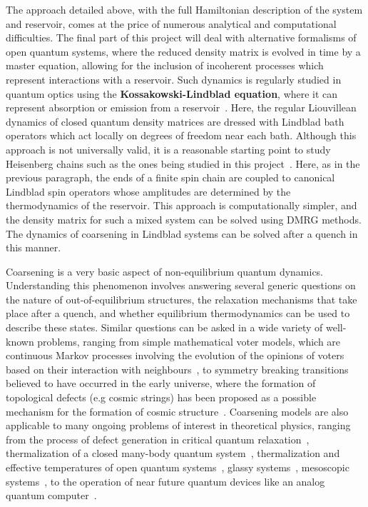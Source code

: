 \documentclass[a4paper,11pt,color]{article}
\begin{document}
The approach detailed above, with the full Hamiltonian description of the system and reservoir, comes at the price of numerous analytical and computational difficulties. The final part of this project will deal with alternative formalisms of open quantum systems, where the reduced density matrix is evolved in time by a master equation, allowing for the inclusion of incoherent processes which represent interactions with a reservoir. Such dynamics is regularly studied in quantum optics using the \textbf{Kossakowski-Lindblad equation}, where it can represent absorption or emission from a reservoir~\cite{lindblad}. Here, the regular Liouvillean dynamics of closed quantum density matrices are dressed with Lindblad bath operators which act locally on degrees of freedom near each bath. Although this approach is not universally valid, it is a reasonable starting point to study Heisenberg chains such as the ones being studied in this project~\cite{spinchains:lindblad}. Here, as in the previous paragraph, the ends of 
a finite spin chain are coupled to canonical Lindblad spin operators whose amplitudes are determined by the thermodynamics of the reservoir.  This approach is computationally simpler, and the density matrix for such a mixed system can be solved using DMRG methods. The dynamics of coarsening in Lindblad systems can be solved after a quench in this manner.

Coarsening is a very basic aspect of non-equilibrium quantum dynamics. Understanding this phenomenon involves answering  several generic questions on the nature of out-of-equilibrium structures, the relaxation mechanisms that take place after
a quench, and whether equilibrium thermodynamics can be used to describe these states.  Similar questions can be asked in a wide variety of well-known problems, ranging from simple mathematical voter models, which are continuous Markov processes involving the evolution of the opinions of voters based on their interaction with neighbours~\cite{votermodel}, to symmetry breaking transitions believed to have occurred in the early universe, where the formation of topological defects (e.g cosmic strings) has been proposed as a possible mechanism for the formation of cosmic structure~\cite{cosmicstrings}. Coarsening models are also applicable to many ongoing problems of interest in theoretical physics, ranging from the process of defect generation in critical quantum relaxation~\cite{relaxation}, thermalization of a closed many-body quantum system~\cite{krishrev, thermalization}, thermalization and effective temperatures of open quantum systems~\cite{thermopen}, glassy systems~\cite{glassy}, mesoscopic systems~\cite{meso}, to the operation of near future quantum devices like an analog quantum computer~\cite{annealing}. 
\end{document}
